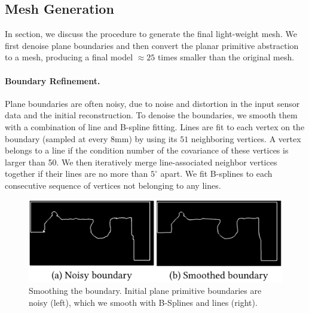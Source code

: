 \subsection{Mesh Generation}
\label{sec:approach-mesh}
In section, we discuss the procedure to generate the final light-weight mesh. 
We first denoise plane boundaries and then convert the planar primitive abstraction to a mesh, producing a final model $\approx 25$ times smaller than the original mesh.

\paragraph*{Boundary Refinement.}
Plane boundaries are often noisy, due to noise and distortion in the input sensor data and the initial reconstruction.
To denoise the boundaries, we smooth them with a combination of line and B-spline fitting.
Lines are fit to each vertex on the boundary (sampled at every 8mm) by using its $51$ neighboring vertices. 
A vertex belongs to a line if the condition number of the covariance of these vertices is larger than 50.
We then iteratively merge line-associated neighbor vertices together if their lines are no more than $5^\circ$ apart.
We fit B-splines to each consecutive sequence of vertices not belonging to any lines.

\begin{figure}
\centering
\includegraphics[width=0.8\linewidth]{3dlite/fig11.png}
\caption{Smoothing the boundary. Initial plane primitive boundaries are noisy (left), which we smooth with B-Splines and lines (right).}
\label{fig:boundary-fit}
\end{figure}

